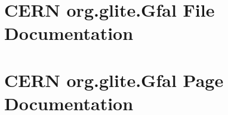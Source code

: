 \documentclass[a4paper]{book}
\begin{document}
\chapter{CERN org.glite.Gfal File Documentation}
















































\chapter{CERN org.glite.Gfal Page Documentation}


\printindex
\end{document}
